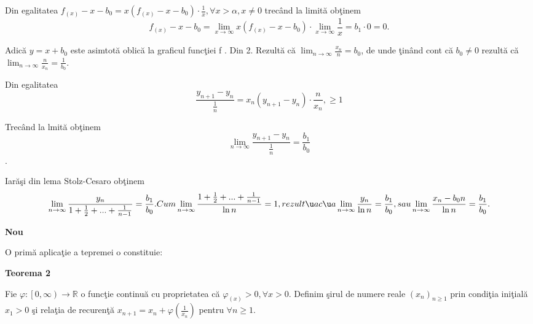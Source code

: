 \documentclass[a4paper,12pt,oneside]{report}
\begin{document}
Din egalitatea \(f_{\left ( x \right )}-x-b_{0}= x\left ( f_{\left ( x \right )}-x-b_{0} \right )\cdot \frac{1}{x}, \forall x>\alpha,x  \neq 0\) trec\^ and la limit\u a ob\c tinem 
\begin{displaymath}
  f_{\left ( x \right )}-x-b_{0}= \lim_{x \to \infty }x\left ( f_{\left ( x \right )}-x-b_{0} \right )\cdot \lim_{x \to \infty }\frac{1}{x} = b_{1}\cdot 0 = 0.
\end{displaymath}

Adic\u a \(y=x+b_{0}\) este asimtot\u a oblic\u a la graficul func\c tiei f . Din 2. Rezult\u a c\u a \(\lim_{n \to \infty }\frac{x_{n}}{n} = b_{0}\), de unde \c tin\^ and cont c\u a \(b_{0}\neq 0\) rezult\u a c\u a \(\lim_{n \to \infty }\frac{n}{x_{n}} = \frac{1}{b_{0}}\). 


Din egalitatea
 \begin{displaymath}
  \frac{y_{n+1} - y_{n}}{\frac{1}{n}} = x_{n}\left ( y_{n+1} -y_{n}\right )\cdot \frac{n}{x_{n}}, \geq 1
\end{displaymath}

Trec\^ and la lmit\u a ob\c tinem 
\begin{displaymath}
  \lim_{n \to \infty }\frac{y_{n+1} - y_{n}}{\frac{1}{n}} = \frac{b_{1}}{b_{0}}
\end{displaymath}
.

Iar\u a\c si din lema Stolz-Cesaro ob\c tinem 
\begin{displaymath}
  \lim_{n \to \infty }\frac{y_{n}}{1+\frac{1}{2}+...+\frac{1}{n-1}} = \frac{b_{1}}{b_{0}} . Cum \lim_{n \to \infty }\frac{{1+\frac{1}{2}+...+\frac{1}{n-1}}}{\ln n} = 1, rezult\u a c\u a \lim_{n \to \infty }\frac{y_{n}}{\ln n } = \frac{b_{1}}{b_{0}}, sau \lim_{n \to \infty }\frac{x_{n}-b_{0}n}{\ln n }  = \frac{b_{1}}{b_{0}}.
\end{displaymath}




\textbf{Nou}



O prim\u a aplica\c tie a tepremei o constituie:

\textbf{Teorema 2}

Fie \(\varphi : \left [ 0,\infty  \right ) \to \mathbb{R}\) o func\c tie continu\u a cu proprietatea c\u a \(\varphi_{\left ( x \right )}> 0, \forall x> 0\). Definim \c sirul de numere reale \(\left ( x_{n} \right )_{n\geq 1}\) prin condi\c tia ini\c tial\u a \(x_{1}> 0\) \c si rela\c tia de recuren\c t\u a \(x_{n+1} = x_{n} + \varphi \left ( \frac{1}{x_{n}} \right )\) pentru \(\forall  n\geq 1\). 
\end{document}
